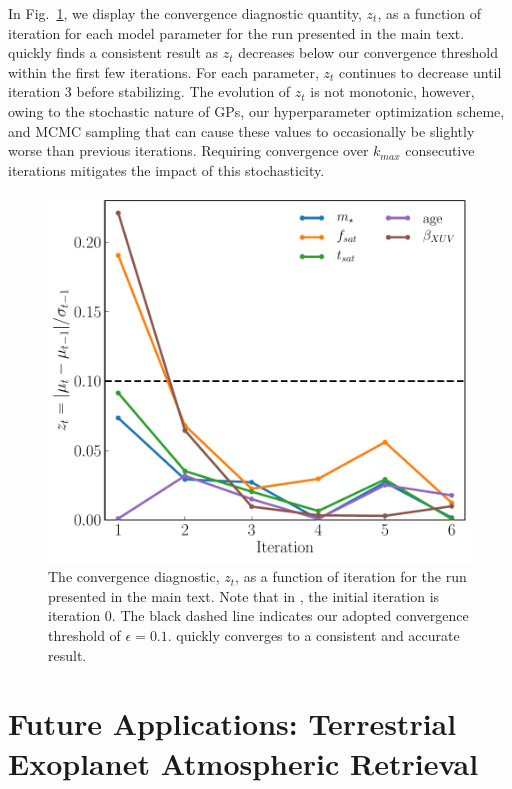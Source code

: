 In Fig.~\ref{AP:fig:convergence}, we display the convergence diagnostic quantity, $z_t$, as a function of iteration for each model parameter for the \approxposterior run presented in the main text. \approxposterior quickly finds a consistent result as $z_t$ decreases below our convergence threshold within the first few iterations. For each parameter, $z_t$ continues to decrease until iteration 3 before stabilizing. The evolution of $z_t$ is not monotonic, however, owing to the stochastic nature of GPs, our hyperparameter optimization scheme, and MCMC sampling that can cause these values to occasionally be slightly worse than previous iterations. Requiring convergence over $k_{max}$ consecutive iterations mitigates the impact of this stochasticity.

\begin{figure}
\centering
	\includegraphics[width=\textwidth]{convergence.pdf}
   \caption{The \approxposterior convergence diagnostic, $z_t$, as a function of iteration for the run presented in the main text. Note that in \approxposterior, the initial iteration is iteration 0. The black dashed line indicates our adopted convergence threshold of $\epsilon = 0.1$. \approxposterior quickly converges to a consistent and accurate result.}%
    \label{AP:fig:convergence}%
\end{figure}

\section{Future Applications: Terrestrial Exoplanet Atmospheric Retrieval}

